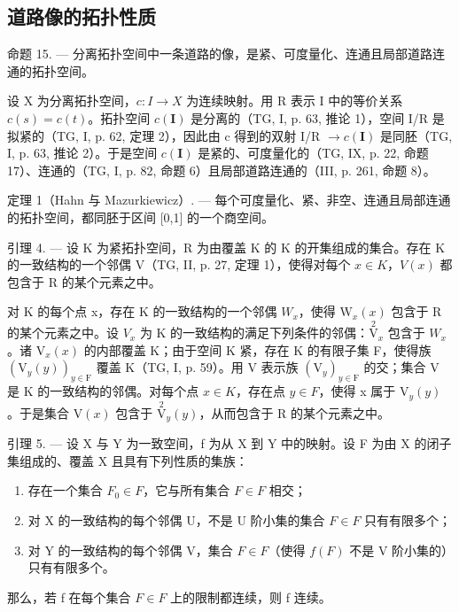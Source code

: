 \subsection{道路像的拓扑性质}

命题 15. --- 分离拓扑空间中一条道路的像，是紧、可度量化、连通且局部道路连通的拓扑空间。

设 X 为分离拓扑空间，\(c\colon I \to X\) 为连续映射。用 R 表示 I 中的等价关系 \(c(s) = c(t)\)。拓扑空间 \(c(\mathbf{I})\) 是分离的（TG, I, p. 63, 推论 1），空间 I/R 是拟紧的（TG, I, p. 62, 定理 2），因此由 c 得到的双射 I/R \(\to c(\mathbf{I})\) 是同胚（TG, I, p. 63, 推论 2）。于是空间 \(c(\mathbf{I})\) 是紧的、可度量化的（TG, IX, p. 22, 命题 17）、连通的（TG, I, p. 82, 命题 6）且局部道路连通的（III, p. 261, 命题 8）。

定理 1（Hahn 与 Mazurkiewicz）. --- 每个可度量化、紧、非空、连通且局部连通的拓扑空间，都同胚于区间 {[}0,1{]} 的一个商空间。

引理 4. --- 设 K 为紧拓扑空间，R 为由覆盖 K 的 K 的开集组成的集合。存在 K 的一致结构的一个邻偶 V（TG, II, p. 27, 定理 1），使得对每个 \(x \in K\)，\(V(x)\) 都包含于 R 的某个元素之中。

对 K 的每个点 x，存在 K 的一致结构的一个邻偶 \(W_{x}\)，使得 \(\mathrm{W}_{x}(x)\) 包含于 R 的某个元素之中。设 \(V_{x}\) 为 K 的一致结构的满足下列条件的邻偶：\(\overset{2}{\mathrm{V}}_{x}\) 包含于 \(W_{x}\)。诸 \(\mathrm{V}_{x}(x)\) 的内部覆盖 K；由于空间 K 紧，存在 K 的有限子集 F，使得族 \((\mathrm{V}_{y}(y))_{y\in\mathrm{F}}\) 覆盖 K（TG, I, p. 59）。用 V 表示族 \((\mathrm{V}_{y})_{y\in\mathrm{F}}\) 的交；集合 V 是 K 的一致结构的邻偶。对每个点 \(x\in K\)，存在点 \(y\in F\)，使得 x 属于 \(\mathrm{V}_{y}(y)\)。于是集合 \(\mathrm{V}(x)\) 包含于 \(\overset{2}{\mathrm{V}}_{y}(y)\)，从而包含于 R 的某个元素之中。

引理 5. --- 设 X 与 Y 为一致空间，f 为从 X 到 Y 中的映射。设 F 为由 X 的闭子集组成的、覆盖 X 且具有下列性质的集族：

\begin{enumerate}
\def\labelenumi{(\roman{enumi})}
\item
  存在一个集合 \(F_{0} \in F\)，它与所有集合 \(F \in F\) 相交；
\item
  对 X 的一致结构的每个邻偶 U，不是 U 阶小集的集合 \(F \in F\) 只有有限多个；
\item
  对 Y 的一致结构的每个邻偶 V，集合 \(F \in F\)（使得 \(f(F)\) 不是 V 阶小集的）只有有限多个。
\end{enumerate}

那么，若 f 在每个集合 \(F \in F\) 上的限制都连续，则 f 连续。

